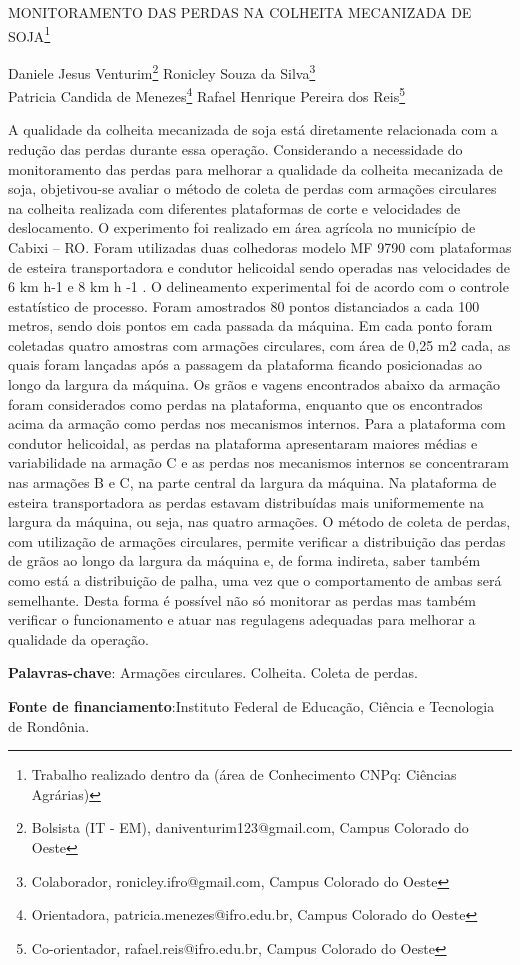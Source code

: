 \documentclass[article,12pt,onesidea,4paper,english,brazil]{abntex2}
\begin{document}
	
	
	\frenchspacing 
	
	\begin{center}
		\LARGE MONITORAMENTO DAS PERDAS NA COLHEITA MECANIZADA DE SOJA\footnote{Trabalho realizado dentro da (área de Conhecimento CNPq: Ciências Agrárias)}
		
		\normalsize
		Daniele Jesus Venturim\footnote{Bolsista (IT - EM), daniventurim123@gmail.com, Campus Colorado do Oeste} 
		Ronicley Souza da Silva\footnote{Colaborador, ronicley.ifro@gmail.com, Campus Colorado do Oeste} \\
		Patricia Candida de Menezes\footnote{Orientadora, patricia.menezes@ifro.edu.br, Campus Colorado do Oeste} 
		Rafael
		Henrique Pereira dos Reis\footnote{Co-orientador, rafael.reis@ifro.edu.br, Campus Colorado do Oeste} 
	\end{center}
	
	\noindent A qualidade da colheita mecanizada de soja está diretamente relacionada com a
	redução das perdas durante essa operação. Considerando a necessidade do
	monitoramento das perdas para melhorar a qualidade da colheita mecanizada de
	soja, objetivou-se avaliar o método de coleta de perdas com armações circulares na
	colheita realizada com diferentes plataformas de corte e velocidades de
	deslocamento. O experimento foi realizado em área agrícola no município de Cabixi
	– RO. Foram utilizadas duas colhedoras modelo MF 9790 com plataformas de
	esteira transportadora e condutor helicoidal sendo operadas nas velocidades de 6
	km h-1 e 8 km h
	-1
	. O delineamento experimental foi de acordo com o controle
	estatístico de processo. Foram amostrados 80 pontos distanciados a cada 100
	metros, sendo dois pontos em cada passada da máquina. Em cada ponto foram
	coletadas quatro amostras com armações circulares, com área de 0,25 m2 cada, as
	quais foram lançadas após a passagem da plataforma ficando posicionadas ao
	longo da largura da máquina. Os grãos e vagens encontrados abaixo da armação
	foram considerados como perdas na plataforma, enquanto que os encontrados
	acima da armação como perdas nos mecanismos internos. Para a plataforma com
	condutor helicoidal, as perdas na plataforma apresentaram maiores médias e
	variabilidade na armação C e as perdas nos mecanismos internos se concentraram
	nas armações B e C, na parte central da largura da máquina. Na plataforma de
	esteira transportadora as perdas estavam distribuídas mais uniformemente na
	largura da máquina, ou seja, nas quatro armações. O método de coleta de perdas,
	com utilização de armações circulares, permite verificar a distribuição das perdas de
	grãos ao longo da largura da máquina e, de forma indireta, saber também como está
	a distribuição de palha, uma vez que o comportamento de ambas será semelhante.
	Desta forma é possível não só monitorar as perdas mas também verificar o
	funcionamento e atuar nas regulagens adequadas para melhorar a qualidade da
	operação.
	
	\vspace{\onelineskip}
	
	\noindent
	\textbf{Palavras-chave}: Armações circulares. Colheita. Coleta de perdas.
	
	\noindent
	\textbf{Fonte de financiamento}:Instituto Federal de Educação, Ciência e Tecnologia de
	Rondônia.
	
\end{document}
